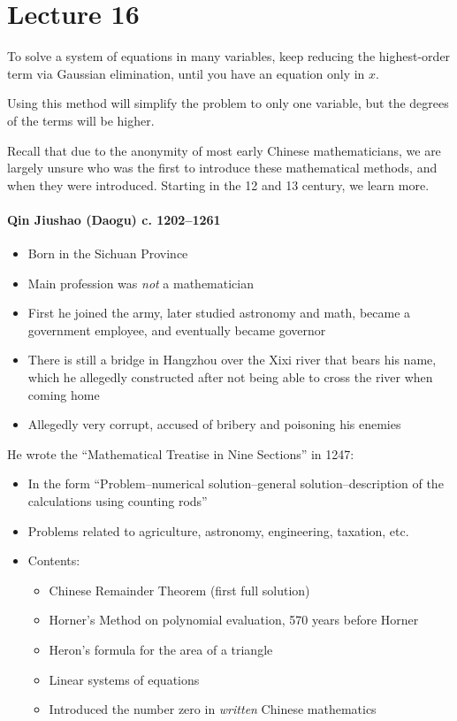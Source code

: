\documentclass[class=article, crop=false]{standalone}
\begin{document}
  \section{Lecture 16}
  To solve a system of equations in many variables, keep reducing the highest-order term via Gaussian elimination, until you have an equation only in $x$.
  \begin{note}{}
    Using this method will simplify the problem to only one variable, but the degrees of the terms will be higher.
  \end{note}
  Recall that due to the anonymity of most early Chinese mathematicians, we are largely unsure who was the first to introduce these mathematical methods, and when they were introduced. Starting in the 12 and 13 century, we learn more. \par
  \paragraph{Qin Jiushao (Daogu) c. 1202--1261}
  \begin{itemize}
    \item Born in the Sichuan Province
    \item Main profession was \emph{not} a mathematician
    \item First he joined the army, later studied astronomy and math, became a government employee, and eventually became governor
    \item There is still a bridge in Hangzhou over the Xixi river that bears his name, which he allegedly constructed after not being able to cross the river when coming home
    \item Allegedly very corrupt, accused of bribery and poisoning his enemies
  \end{itemize}
  He wrote the ``Mathematical Treatise in Nine Sections'' in 1247:
  \begin{itemize}
    \item In the form ``Problem--numerical solution--general solution--description of the calculations using counting rods''
    \item Problems related to agriculture, astronomy, engineering, taxation, etc.
    \item Contents:
    \begin{itemize}
      \item Chinese Remainder Theorem (first full solution)
      \item Horner's Method on polynomial evaluation, 570 years before Horner
      \item Heron's formula for the area of a triangle
      \item Linear systems of equations
      \item Introduced the number zero in \emph{written} Chinese mathematics
    \end{itemize}
  \end{itemize}
\end{document}
